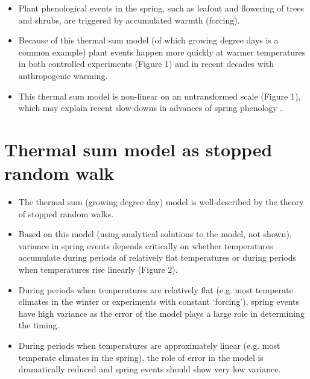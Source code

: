 \documentclass[11pt]{article}
\begin{document}
\begin{itemize}
\item Plant phenological events in the spring, such as leafout and flowering of trees and shrubs, are triggered by accumulated warmth (forcing).
\item Because of this thermal sum model (of which growing degree days is a common example) plant events happen more quickly at warmer temperatures in both controlled experiments (Figure 1) and in recent decades with anthropogenic warming. 
\item This thermal sum model is non-linear on an untransformed scale (Figure 1), which may explain recent slow-downs in advances of spring phenology \citep{wolkovich2021simple}.
\end{itemize}

\section*{Thermal sum model as stopped random walk}

\begin{itemize}
\item The thermal sum (growing degree day) model is well-described by the theory of stopped random walks. %
\item Based on this model (using analytical solutions to the model, not shown), variance in spring events depends critically on whether temperatures accumulate during periods of relatively flat temperatures or during periods when temperatures rise linearly (Figure 2). 
\item During periods when temperatures are relatively flat (e.g. most temperate climates in the winter or experiments with constant `forcing'), spring events have high variance as the error of the model plays a large role in determining the timing.
\item During periods when temperatures are approximately linear (e.g. most temperate climates in the spring), the role of error in the model is dramatically reduced and spring events should show very low variance. 
\end{itemize}
\end{document}
